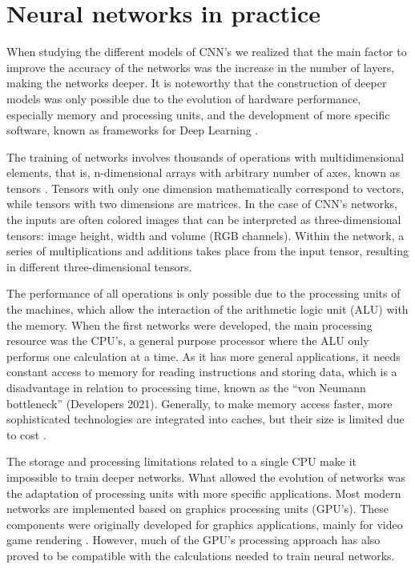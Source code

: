 \section{Neural networks in practice}
When studying the different models of CNN's we realized that the main factor to improve the accuracy of the networks was the increase in the number of layers, making the networks deeper. It is noteworthy that the construction of deeper models was only possible due to the evolution of hardware performance, especially memory and processing units, and the development of more specific software, known as frameworks for Deep Learning  \cite{zhang2020dive}.

The training of networks involves thousands of operations with multidimensional elements, that is, n-dimensional arrays with arbitrary number of axes, known as tensors \cite{zhang2020dive}. Tensors with only one dimension mathematically correspond to vectors, while tensors with two dimensions are matrices. In the case of CNN's networks, the inputs are often colored images that can be interpreted as three-dimensional tensors: image height, width and volume (RGB channels). Within the network, a series of multiplications and additions takes place from the input tensor, resulting in different three-dimensional tensors.

The performance of all operations is only possible due to the processing units of the machines, which allow the interaction of the arithmetic logic unit (ALU) with the memory. When the first networks were developed, the main processing resource was the CPU's, a general purpose processor where the ALU only performs one calculation at a time. As it has more general applications, it needs constant access to memory for reading instructions and storing data, which is a disadvantage in relation to processing time, known as the “von Neumann bottleneck” (Developers 2021). Generally, to make memory access faster, more sophisticated technologies are integrated into caches, but their size is limited due to cost \cite{zhang2020dive}.

The storage and processing limitations related to a single CPU make it impossible to train deeper networks. What allowed the evolution of networks was the adaptation of processing units with more specific applications. Most modern networks are implemented based on graphics processing units (GPU's). These components were originally developed for graphics applications, mainly for video game rendering \cite{goodfellow2016}. However, much of the GPU's processing approach has also proved to be compatible with the calculations needed to train neural networks.

